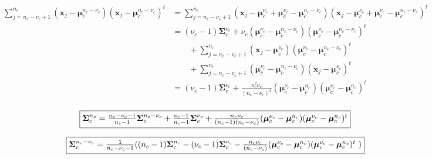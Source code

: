 \documentclass[a4paper,11pt,DIV=16]{scrartcl}
\begin{document}
        \begin{align*}
            \sum_{j = n_c-\nu_c+1}^{n_c} (\mathbf{x}_j - \boldsymbol{\mu}_c^{n_c-\nu_c}) (\mathbf{x}_j - \boldsymbol{\mu}_c^{n_c-\nu_c})^t
                &= \sum_{j = n_c-\nu_c+1}^{n_c} (\mathbf{x}_j - \boldsymbol{\mu}_c^{\nu_c} + \boldsymbol{\mu}_c^{\nu_c} - \boldsymbol{\mu}_c^{n_c-\nu_c}) (\mathbf{x}_j - \boldsymbol{\mu}_c^{\nu_c} + \boldsymbol{\mu}_c^{\nu_c} - \boldsymbol{\mu}_c^{n_c-\nu_c})^t\\
                &= (\nu_c-1) \boldsymbol{\Sigma}_c^{\nu_c} + \nu_c (\boldsymbol{\mu}_c^{\nu_c}-\boldsymbol{\mu}_c^{n_c-\nu_c})(\boldsymbol{\mu}_c^{\nu_c}-\boldsymbol{\mu}_c^{n_c-\nu_c})^t\\
                &\qquad + \sum_{j = n_c-\nu_c+1}^{n_c} (\mathbf{x}_j - \boldsymbol{\mu}_c^{\nu_c}) (\boldsymbol{\mu}_c^{\nu_c} - \boldsymbol{\mu}_c^{n_c-\nu_c})^t\\
                &\qquad + \sum_{j = n_c-\nu_c+1}^{n_c} (\boldsymbol{\mu}_c^{\nu_c} - \boldsymbol{\mu}_c^{n_c-\nu_c}) (\mathbf{x}_j - \boldsymbol{\mu}_c^{\nu_c})^t\\
                &= (\nu_c-1) \boldsymbol{\Sigma}_c^{\nu_c} + \frac{n_c^2 \nu_c}{(n_c-\nu_c)^2} (\boldsymbol{\mu}_c^{\nu_c}-\boldsymbol{\mu}_c^{n_c})(\boldsymbol{\mu}_c^{\nu_c}-\boldsymbol{\mu}_c^{n_c})^t \\
        \end{align*}

        \begin{equation}
            \fbox{$\boldsymbol{\Sigma}_c^{n_c} = \frac{n_c-\nu_c-1}{n_c-1} \boldsymbol{\Sigma}_c^{n_c-\nu_c} + \frac{\nu_c-1}{n_c-1} \boldsymbol{\Sigma}_c^{\nu_c} + \frac{n_c \nu_c}{(n_c-1)(n_c-\nu_c)} (\boldsymbol{\mu}_c^{\nu_c}-\boldsymbol{\mu}_c^{n_c})(\boldsymbol{\mu}_c^{\nu_c}-\boldsymbol{\mu}_c^{n_c})^t$}
        \end{equation}

        \begin{equation}
            \fbox{$\boldsymbol{\Sigma}_c^{n_c-\nu_c} = \frac{1}{n_c-\nu_c-1} ( (n_c-1) \boldsymbol{\Sigma}_c^{n_c} - (\nu_c-1) \boldsymbol{\Sigma}_c^{\nu_c} - \frac{n_c \nu_c}{(n_c-\nu_c)} (\boldsymbol{\mu}_c^{\nu_c}-\boldsymbol{\mu}_c^{n_c})(\boldsymbol{\mu}_c^{\nu_c}-\boldsymbol{\mu}_c^{n_c})^t$ )}
        \end{equation}




\end{document}
